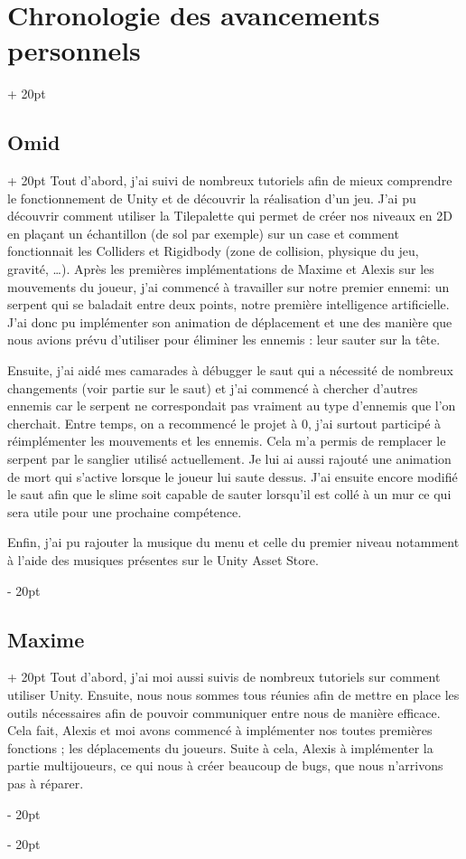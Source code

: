 \documentclass[a4paper, 12pt, twoside]{article}
\newcommand{\ind}[1][20pt]{\advance\leftskip + #1}
\newcommand{\deind}[1][20pt]{\advance\leftskip - #1}
\newenvironment{indt}[2][20pt]{#2 \par \ind[#1]}{\par \deind} %
\begin{document}
\begin{indt}{\section{Chronologie des avancements personnels}}
        \begin{indt}{\subsection{Omid}}
            Tout d'abord, j'ai suivi de nombreux tutoriels afin de mieux comprendre le fonctionnement de Unity et de découvrir la réalisation d'un jeu. J'ai pu découvrir comment utiliser la Tilepalette qui permet de créer nos niveaux en 2D en plaçant un échantillon (de sol par exemple) sur un case et comment fonctionnait les Colliders et Rigidbody (zone de collision, physique du jeu, gravité, …). Après les premières implémentations de Maxime et Alexis sur les mouvements du joueur, j'ai commencé à travailler sur notre premier ennemi: un serpent qui se baladait entre deux points, notre première intelligence artificielle. J'ai donc pu implémenter son animation de déplacement et une des manière que nous avions prévu d'utiliser pour éliminer les ennemis : leur sauter sur la tête. 

            Ensuite, j'ai aidé mes camarades à débugger le saut qui a nécessité de nombreux changements (voir partie sur le saut) et j'ai commencé à chercher d'autres ennemis car le serpent ne correspondait pas vraiment au type d'ennemis que l'on cherchait. Entre temps, on a recommencé le projet à 0, j'ai surtout participé à réimplémenter les mouvements et les ennemis. Cela m'a permis de remplacer le serpent par le sanglier utilisé actuellement. Je lui ai aussi rajouté une animation de mort qui s'active lorsque le joueur lui saute dessus. J'ai ensuite encore modifié le saut afin que le slime soit capable de sauter lorsqu'il est collé à un mur ce qui sera utile pour une prochaine compétence.

            Enfin, j'ai pu rajouter la musique du menu et celle du premier niveau notamment à l'aide des musiques présentes sur le Unity Asset Store.
        \end{indt}

        \begin{indt}{\subsection{Maxime}}
            Tout d'abord, j'ai moi aussi suivis de nombreux tutoriels sur comment utiliser Unity. Ensuite, nous nous sommes tous réunies afin de mettre en place les outils nécessaires afin de pouvoir communiquer entre nous de manière efficace. Cela fait, Alexis et moi avons commencé à implémenter nos  toutes premières fonctions ; les déplacements du joueurs. Suite à cela, Alexis à implémenter la partie multijoueurs, ce qui nous à créer beaucoup de bugs, que nous n'arrivons pas à réparer.


\end{indt}
\end{indt}
\end{document}

